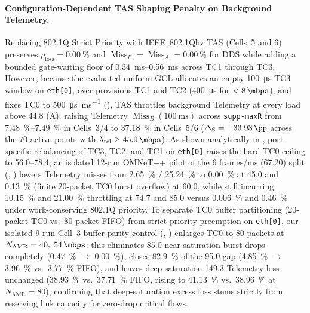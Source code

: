 \documentclass[11pt,a4paper]{article}
\newcommand{\Namr}{\ensuremath{N_{\mathrm{AMR}}}}
\newcommand{\ltel}{\ensuremath{\lambda_{\mathrm{tel}}}}
\newcommand{\MissA}{\ensuremath{\operatorname{Miss}_A}}
\newcommand{\MissB}{\ensuremath{\operatorname{Miss}_B}}
\newcommand{\ploss}{\ensuremath{p_{\mathrm{loss}}}}
\newcommand{\GainS}{\ensuremath{\Delta_{\mathrm{S}}}}
\begin{document}
\paragraph{Configuration-Dependent TAS Shaping Penalty on Background Telemetry.}
Replacing 802.1Q Strict Priority with IEEE~802.1Qbv TAS (Cells~5 and 6) preserves $\ploss = \qty{0.00}{\percent}$ and $\MissB = \MissA = \qty{0.00}{\percent}$ for DDS while adding a bounded gate-waiting floor of \qtyrange{0.34}{0.56}{\milli\second} across TC1 through TC3. However, because the evaluated uniform GCL allocates an empty \qty{100}{\micro\second} TC3 window on \texttt{eth[0]}, over-provisions TC1 and TC2 (\qty{400}{\micro\second} for $<\qty{8}{\mbps}$), and fixes TC0 to \qty{500}{\micro\second\per\milli\second} (), TAS throttles background Telemetry at every load above \qty{44.8}{\mbps} (A), raising Telemetry $\MissB(\qty{100}{\milli\second})$ across \texttt{supp-maxR} from \qtyrange{7.48}{7.49}{\percent} in Cells~3/4 to \qty{37.18}{\percent} in Cells~5/6 ($\GainS = \qty{-33.93}{\pp}$ across the $70$ active points with $\ltel \ge \qty{45.0}{\mbps}$). As shown analytically in , port-specific rebalancing of TC3, TC2, and TC1 on \texttt{eth[0]} raises the hard TC0 ceiling to \qtyrange{56.0}{78.4}{\mbps}; an isolated 12-run OMNeT++ pilot of the $6\text{ frames/ms}$ (\qty{67.20}{\mbps}) split (, ) lowers Telemetry misses from \qty{2.65}{\percent} / \qty{25.24}{\percent} to \qty{0.00}{\percent} at \qty{45.0}{\mbps} and \qty{0.13}{\percent} (finite 20-packet TC0 burst overflow) at \qty{60.0}{\mbps}, while still incurring \qty{10.15}{\percent} and \qty{21.00}{\percent} throttling at \qty{74.7}{\mbps} and \qty{85.0}{\mbps} versus \qty{0.006}{\percent} and \qty{0.46}{\percent} under work-conserving 802.1Q priority. To separate TC0 buffer partitioning (20-packet TC0 vs.\ 80-packet FIFO) from strict-priority preemption on \texttt{eth[0]}, our isolated 9-run Cell~3 buffer-parity control (, ) enlarges TC0 to 80 packets at $\Namr=40,\; \qty{54}{\mbps}$: this eliminates \qty{85.0}{\mbps} near-saturation burst drops completely (\qty{0.47}{\percent} $\to$ \qty{0.00}{\percent}), closes \qty{82.9}{\percent} of the \qty{95.0}{\mbps} gap (\qty{4.85}{\percent} $\to$ \qty{3.96}{\percent} vs.\ \qty{3.77}{\percent} FIFO), and leaves deep-saturation \qty{149.3}{\mbps} Telemetry loss unchanged (\qty{38.93}{\percent} vs.\ \qty{37.71}{\percent} FIFO, rising to \qty{41.13}{\percent} vs.\ \qty{38.96}{\percent} at $\Namr=80$), confirming that deep-saturation excess loss stems strictly from reserving link capacity for zero-drop critical flows.
\end{document}
